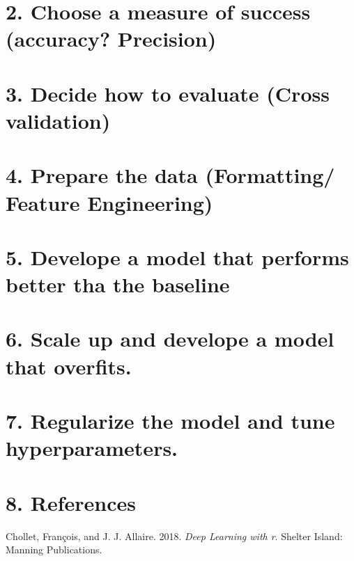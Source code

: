 \documentclass[
]{report}
\newlength{\cslhangindent}
\newenvironment{CSLReferences}[2] %
 {%
  \setlength{\parindent}{0pt}
  \ifodd #1 \everypar{\setlength{\hangindent}{\cslhangindent}}\ignorespaces\fi
  \ifnum #2 > 0
  \setlength{\parskip}{#2\baselineskip}
  \fi
 }%
 {}
\begin{document}
\hypertarget{choose-a-measure-of-success-accuracy-precision}{%
\chapter{2. Choose a measure of success (accuracy?
Precision)}\label{choose-a-measure-of-success-accuracy-precision}}

\hypertarget{decide-how-to-evaluate-cross-validation}{%
\chapter{3. Decide how to evaluate (Cross
validation)}\label{decide-how-to-evaluate-cross-validation}}

\hypertarget{prepare-the-data-formatting-feature-engineering}{%
\chapter{4. Prepare the data (Formatting/ Feature
Engineering)}\label{prepare-the-data-formatting-feature-engineering}}

\hypertarget{develope-a-model-that-performs-better-tha-the-baseline}{%
\chapter{5. Develope a model that performs better tha the
baseline}\label{develope-a-model-that-performs-better-tha-the-baseline}}

\hypertarget{scale-up-and-develope-a-model-that-overfits.}{%
\chapter{6. Scale up and develope a model that
overfits.}\label{scale-up-and-develope-a-model-that-overfits.}}

\hypertarget{regularize-the-model-and-tune-hyperparameters.}{%
\chapter{7. Regularize the model and tune
hyperparameters.}\label{regularize-the-model-and-tune-hyperparameters.}}

\hypertarget{references}{%
\chapter{8. References}\label{references}}

\hypertarget{refs}{}
\begin{CSLReferences}{1}{0}
\leavevmode{}%
Chollet, François, and J. J. Allaire. 2018. \emph{Deep Learning with r}.
Shelter Island: {Manning Publications}.

\end{CSLReferences}
\end{document}
